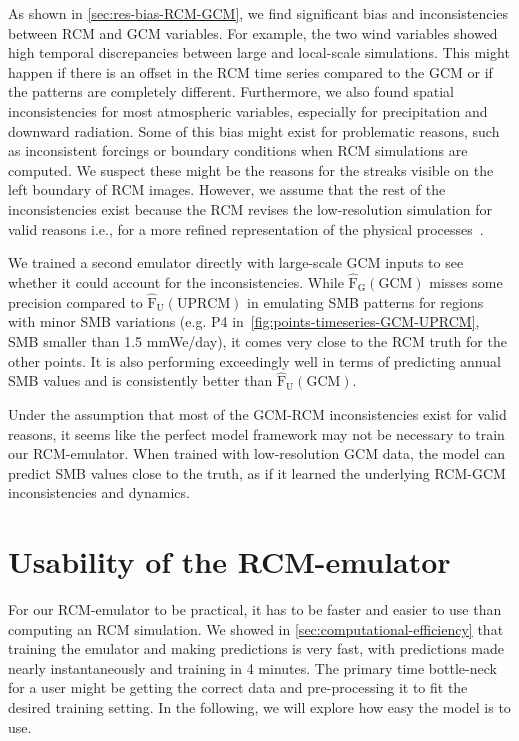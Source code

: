 \documentclass[a4paper,11pt,oneside]{report}
\begin{document}
As shown in \autoref{sec:res-bias-RCM-GCM}, we find significant bias and inconsistencies between RCM and GCM variables. For example, the two wind variables showed high temporal discrepancies between large and local-scale simulations. This might happen if there is an offset in the RCM time series compared to the GCM or if the patterns are completely different. Furthermore, we also found spatial inconsistencies for most atmospheric variables, especially for precipitation and downward radiation. Some of this bias might exist for problematic reasons, such as inconsistent forcings or boundary conditions when RCM simulations are computed. We suspect these might be the reasons for the streaks visible on the left boundary of RCM images. However, we assume that the rest of the inconsistencies exist because the RCM revises the low-resolution simulation for valid reasons i.e., for a more refined representation of the physical processes~\cite{Doury, S_rland_2018, Vasubandhu2007, Noguer1998, Laprise2008ChallengingST}. 


 We trained a second emulator directly with large-scale GCM inputs to see whether it could account for the inconsistencies. While $\mathrm{\hat{F}_{G}(GCM)}$ misses some precision compared to $\mathrm{\hat{F}_{U}(UPRCM)}$ in emulating SMB patterns for regions with minor SMB variations (e.g. P4 in~\autoref{fig:points-timeseries-GCM-UPRCM}, SMB smaller than 1.5 \si{mmWe/day}), it comes very close to the RCM truth for the other points. It is also performing exceedingly well in terms of predicting annual SMB values and is consistently better than $\mathrm{\hat{F}_{U}(GCM)}$. 


Under the assumption that most of the GCM-RCM inconsistencies exist for valid reasons, it seems like the perfect model framework may not be necessary to train our RCM-emulator. When trained with low-resolution GCM data, the model can predict SMB values close to the truth, as if it learned the underlying RCM-GCM inconsistencies and dynamics.   



\section{Usability of the RCM-emulator}\label{sec:utility-emulators}
For our RCM-emulator to be practical, it has to be faster and easier to use than computing an RCM simulation. We showed in \autoref{sec:computational-efficiency} that training the emulator and making predictions is very fast, with predictions made nearly instantaneously and training in 4 minutes. The primary time bottle-neck for a user might be getting the correct data and pre-processing it to fit the desired training setting. In the following, we will explore how easy the model is to use. 
\end{document}
